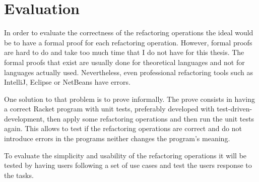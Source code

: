 
% 
% 

\section{Evaluation}


In order to evaluate the correctness of the refactoring operations the ideal would be to have a formal proof for each refactoring operation.
However, formal proofs are hard to do and take too much time that I do not have for this thesis.
The formal proofs that exist are usually done for theoretical languages and not for languages actually used.
Nevertheless, even professional refactoring tools such as IntelliJ, Eclipse or NetBeans have errors. \cite{verbaere2006jungl} 

One solution to that problem is to prove informally. 
The prove consists in having a correct Racket program with unit tests, preferably developed with test-driven-development, then apply some refactoring operations and then run the unit tests again. 
This allows to test if the refactoring operations are correct and do not introduce errors in the programs neither changes the program's meaning.

To evaluate the simplicity and usability of the refactoring operations it will be tested by having users following a set of use cases and test the users response to the tasks.